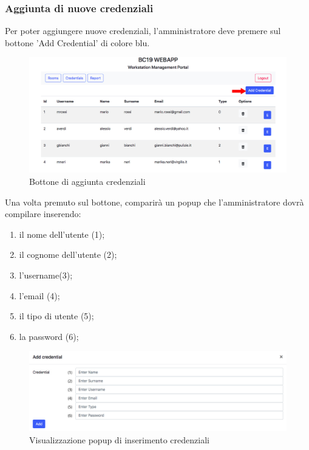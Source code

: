 \subsubsection{Aggiunta di nuove credenziali}
Per poter aggiungere nuove credenziali, l'amministratore deve premere sul bottone 'Add Credential' di colore blu.
\begin{figure}[H]
	\centering
	\includegraphics[width=15cm]{res/images/addCredential.jpg}
	\caption{Bottone di aggiunta credenziali}
\end{figure}
Una volta premuto sul bottone, comparirà un popup che l'amministratore dovrà compilare inserendo:
\begin{enumerate}
	\item il nome dell'utente (1);
	\item il cognome dell'utente (2);
	\item l'username(3);
	\item l'email (4);
	\item il tipo di utente (5);
	\item la password (6);
\end{enumerate}
\begin{figure}[H]
	\centering
	\includegraphics[width=15cm]{res/images/addc.jpg}
	\caption{Visualizzazione popup di inserimento credenziali}
\end{figure}


